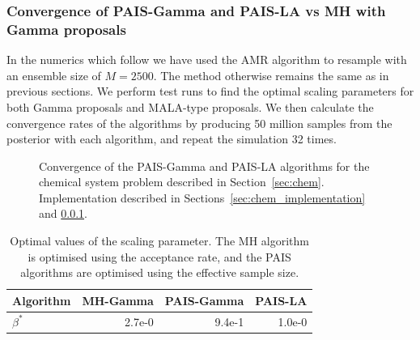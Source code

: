 \documentclass[final]{siamltex}
\begin{document}
\subsubsection{Convergence of PAIS-Gamma and PAIS-LA vs MH with Gamma proposals}\label{sec:chem_conv}

In the numerics which follow we have used the AMR algorithm to resample with an ensemble size of $M=2500$. The method otherwise remains the same as in previous sections. We perform test runs to find the optimal scaling parameters for both Gamma proposals and MALA-type proposals. We then calculate the convergence rates of the algorithms by producing 50 million samples from the posterior with each algorithm, and repeat the simulation 32 times.

\begin{figure}[htb]
\centering
{}
\caption{Convergence of the PAIS-Gamma and PAIS-LA algorithms for the chemical system problem described in Section~\ref{sec:chem}. Implementation described in Sections~\ref{sec:chem_implementation} and \ref{sec:chem_conv}.}
\label{fig:C1_ESS}
\end{figure}

\begin{table}[!htb]
      \centering
        \begin{tabular}{|l|r|r|r|}
	\hline
	Algorithm	& MH-Gamma & PAIS-Gamma & PAIS-LA \\ \hline
	$\beta^*$	& 2.7e-0     & 9.4e-1    & 1.0e-0 \\
	\hline
	\end{tabular}
	\vspace{1mm}
	\caption{Optimal values of the scaling parameter. The MH algorithm is optimised using the acceptance rate, and the PAIS algorithms are optimised using the effective sample size.}
	\label{table:C1_opt_beta}
\end{table}
\end{document}
